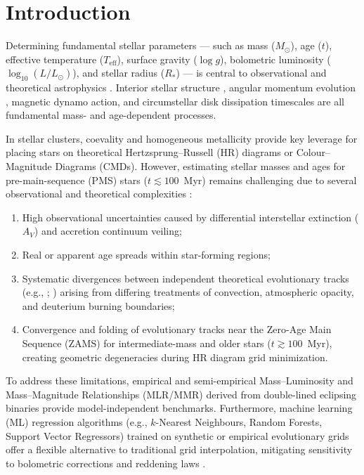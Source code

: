 \documentclass[fleqn,usenatbib]{mnras}
\begin{document}


\section{Introduction}
\label{sec:intro}

Determining fundamental stellar parameters --- such as mass ($M_\odot$), age ($t$), effective temperature ($T_{\text{eff}}$), surface gravity ($\log g$), bolometric luminosity ($\log_{10}(L/L_\odot)$), and stellar radius ($R_*$) --- is central to observational and theoretical astrophysics \citep{serenelli2021weighing}. Interior stellar structure \citep{baraffe2015new}, angular momentum evolution \citep{bell2014pre}, magnetic dynamo action, and circumstellar disk dissipation timescales are all fundamental mass- and age-dependent processes.

In stellar clusters, coevality and homogeneous metallicity provide key leverage for placing stars on theoretical Hertzsprung--Russell (HR) diagrams or Colour--Magnitude Diagrams (CMDs). However, estimating stellar masses and ages for pre-main-sequence (PMS) stars ($t \lesssim 100$~Myr) remains challenging due to several observational and theoretical complexities \citep{herczeg2015empirical}:
\begin{enumerate}
    \item High observational uncertainties caused by differential interstellar extinction ($A_V$) and accretion continuum veiling;
    \item Real or apparent age spreads within star-forming regions;
    \item Systematic divergences between independent theoretical evolutionary tracks (e.g., \citealt{siess2000internet}; \citealt{baraffe2015new}) arising from differing treatments of convection, atmospheric opacity, and deuterium burning boundaries;
    \item Convergence and folding of evolutionary tracks near the Zero-Age Main Sequence (ZAMS) for intermediate-mass and older stars ($t \gtrsim 100$~Myr), creating geometric degeneracies during HR diagram grid minimization.
\end{enumerate}

To address these limitations, empirical and semi-empirical Mass--Luminosity and Mass--Magnitude Relationships (MLR/MMR) derived from double-lined eclipsing binaries \citep{delfosse2000accurate, benedict2016solar} provide model-independent benchmarks. Furthermore, machine learning (ML) regression algorithms (e.g., $k$-Nearest Neighbours, Random Forests, Support Vector Regressors) trained on synthetic or empirical evolutionary grids offer a flexible alternative to traditional grid interpolation, mitigating sensitivity to bolometric corrections and reddening laws \citep{lodieu2019fiveD}.
\end{document}
